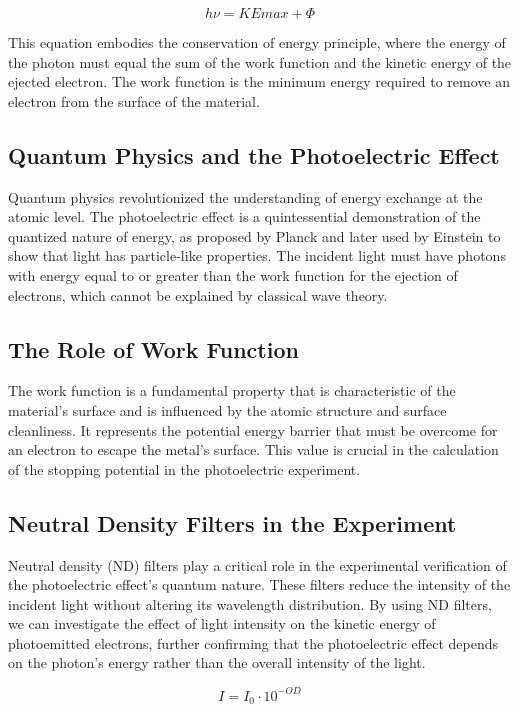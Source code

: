\documentclass[12pt]{article}
\begin{document}
\begin{equation}
h\nu = KEmax + \Phi
\end{equation}

This equation embodies the conservation of energy principle, where the energy of the photon must equal the
sum of the work function and the kinetic energy of the ejected electron. The work function is the minimum
energy required to remove an electron from the surface of the material.

\subsection{Quantum Physics and the Photoelectric Effect}
Quantum physics revolutionized the understanding of energy exchange at the atomic level. The photoelectric
effect is a quintessential demonstration of the quantized nature of energy, as proposed by Planck and later
used by Einstein to show that light has particle-like properties. The incident light must have photons with
energy equal to or greater than the work function for the ejection of electrons, which cannot be explained
by classical wave theory. 

\subsection{The Role of Work Function}
The work function is a fundamental property that is characteristic of the material's surface and is influenced 
by the atomic structure and surface cleanliness. It represents the potential energy barrier that must be overcome 
for an electron to escape the metal's surface. This value is crucial in the calculation of the stopping potential in 
the photoelectric experiment.

\subsection{Neutral Density Filters in the Experiment}
Neutral density (ND) filters play a critical role in the experimental verification of the photoelectric effect's 
quantum nature. These filters reduce the intensity of the incident light without altering its wavelength distribution. 
By using ND filters, we can investigate the effect of light intensity on the kinetic energy of photoemitted electrons, 
further confirming that the photoelectric effect depends on the photon's energy rather than the overall intensity of the light.

\begin{equation}
I = I_0 \cdot 10^{-OD}
\end{equation}
\end{document}
